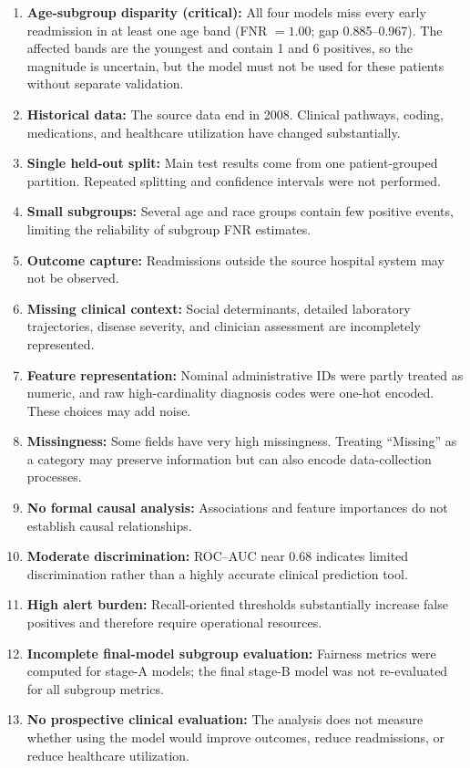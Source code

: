 \documentclass[10pt,a4paper]{article}
\begin{document}
\begin{enumerate}[leftmargin=1.2cm]
\item \textbf{Age-subgroup disparity (critical):} All four models miss every early readmission in at least one age band (FNR $=1.00$; gap 0.885--0.967). The affected bands are the youngest and contain 1 and 6 positives, so the magnitude is uncertain, but the model must not be used for these patients without separate validation.
\item \textbf{Historical data:} The source data end in 2008. Clinical pathways, coding, medications, and healthcare utilization have changed substantially.
\item \textbf{Single held-out split:} Main test results come from one patient-grouped partition. Repeated splitting and confidence intervals were not performed.
\item \textbf{Small subgroups:} Several age and race groups contain few positive events, limiting the reliability of subgroup FNR estimates.
\item \textbf{Outcome capture:} Readmissions outside the source hospital system may not be observed.
\item \textbf{Missing clinical context:} Social determinants, detailed laboratory trajectories, disease severity, and clinician assessment are incompletely represented.
\item \textbf{Feature representation:} Nominal administrative IDs were partly treated as numeric, and raw high-cardinality diagnosis codes were one-hot encoded. These choices may add noise.
\item \textbf{Missingness:} Some fields have very high missingness. Treating ``Missing'' as a category may preserve information but can also encode data-collection processes.
\item \textbf{No formal causal analysis:} Associations and feature importances do not establish causal relationships.
\item \textbf{Moderate discrimination:} ROC--AUC near 0.68 indicates limited discrimination rather than a highly accurate clinical prediction tool.
\item \textbf{High alert burden:} Recall-oriented thresholds substantially increase false positives and therefore require operational resources.
\item \textbf{Incomplete final-model subgroup evaluation:} Fairness metrics were computed for stage-A models; the final stage-B model was not re-evaluated for all subgroup metrics.
\item \textbf{No prospective clinical evaluation:} The analysis does not measure whether using the model would improve outcomes, reduce readmissions, or reduce healthcare utilization.

\end{enumerate}
\end{document}
